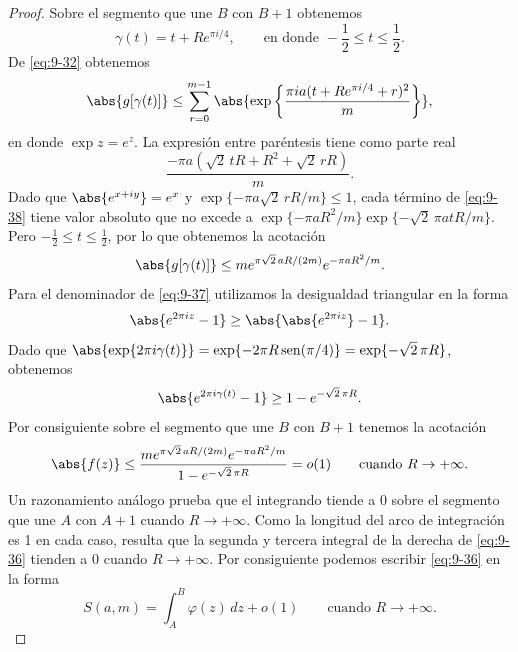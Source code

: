 \documentclass[12pt,a4paper]{book}
\begin{document}
\begin{proof}
        Sobre el segmento que une $B$ con $B+1$ obtenemos
        \begin{equation*}
            \gamma(t)=t+Re^{\pi i/4},\qquad\text{en donde }-\frac{1}{2}\leq t\leq\frac{1}{2}.
        \end{equation*}
        De \eqref{eq:9-32} obtenemos
        \begin{equation}\label{eq:9-38}
            \abs{g[\gamma(t)]}\leq\sum_{r=0}^{m-1}\abs{\exp\left\{\frac{\pi ia(t+Re^{\pi i/4}+r)^{2}}{m}\right\}},
        \end{equation}
        en donde $\exp z=e^{z}$. La expresión entre paréntesis tiene como parte real
        \begin{equation*}
            \frac{-\pi a\left(\sqrt{2}\,tR+R^{2}+\sqrt{2}\,rR\right)}{m}.
        \end{equation*}
        Dado que $\abs{e^{x+iy}}=e^{x}$ y $\exp\{-\pi a\sqrt{2}\,rR/m\}\leq1$, cada término de
        \eqref{eq:9-38} tiene valor absoluto que no excede a
        $\exp\{-\pi aR^{2}/m\}\exp\{-\sqrt{2}\,\pi atR/m\}$. Pero $-\frac{1}{2}\leq t\leq\frac{1}{2}$,
        por lo que obtenemos la acotación
        \begin{equation*}
            \abs{g[\gamma(t)]}\leq me^{\pi\sqrt{2}\,aR/(2m)}e^{-\pi aR^{2}/m}.
        \end{equation*}
        Para el denominador de \eqref{eq:9-37} utilizamos la desigualdad triangular en la
        forma
        \begin{equation*}
            \abs{e^{2\pi iz}-1}\geq\abs{\abs{e^{2\pi iz}}-1}.
        \end{equation*}
        Dado que $\abs{\exp\{2\pi i\gamma(t)\}}=\exp\{-2\pi R\operatorname{sen}(\pi/4)\}=\exp\{-\sqrt{2}\,\pi R\}$,
        obtenemos
        \begin{equation*}
            \abs{e^{2\pi i\gamma(t)}-1}\geq1-e^{-\sqrt{2}\,\pi R}.
        \end{equation*}
        Por consiguiente sobre el segmento que une $B$ con $B+1$ tenemos la acotación
        \begin{equation*}
            \abs{f(z)}\leq\frac{me^{\pi\sqrt{2}\,aR/(2m)}e^{-\pi aR^{2}/m}}{1-e^{-\sqrt{2}\,\pi R}}=o(1)\qquad\text{cuando }R\to+\infty.
        \end{equation*}
        Un razonamiento análogo prueba que el integrando tiende a 0 sobre el segmento que
        une $A$ con $A+1$ cuando $R\to+\infty$. Como la longitud del arco de integración es
        1 en cada caso, resulta que la segunda y tercera integral de la derecha de
        \eqref{eq:9-36} tienden a 0 cuando $R\to+\infty$. Por consiguiente podemos escribir
        \eqref{eq:9-36} en la forma
        \begin{equation}\label{eq:9-39}
            S(a,m)=\int_{A}^{B}\varphi(z)\,dz+o(1)\qquad\text{cuando }R\to+\infty.
        \end{equation}


\end{proof}
\end{document}
